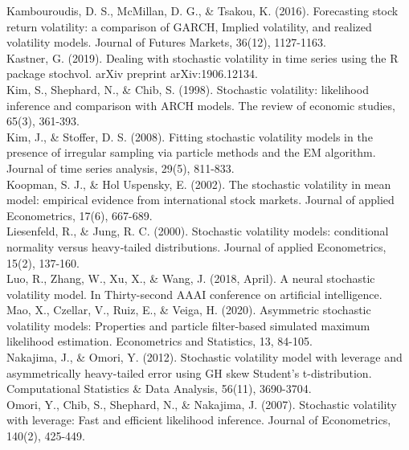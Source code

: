 \documentclass[
]{book}
\theoremstyle{break}
\theoremstyle{nonumberplain}
\begin{document}
Kambouroudis, D. S., McMillan, D. G., \& Tsakou, K. (2016). Forecasting
stock return volatility: a comparison of GARCH, Implied volatility, and
realized volatility models. Journal of Futures Markets, 36(12),
1127-1163.\\

Kastner, G. (2019). Dealing with stochastic volatility in time series
using the R package stochvol. arXiv preprint arXiv:1906.12134.\\

Kim, S., Shephard, N., \& Chib, S. (1998). Stochastic volatility:
likelihood inference and comparison with ARCH models. The review of
economic studies, 65(3), 361-393.\\

Kim, J., \& Stoffer, D. S. (2008). Fitting stochastic volatility models
in the presence of irregular sampling via particle methods and the EM
algorithm. Journal of time series analysis, 29(5), 811-833.\\

Koopman, S. J., \& Hol Uspensky, E. (2002). The stochastic volatility in
mean model: empirical evidence from international stock markets. Journal
of applied Econometrics, 17(6), 667-689.\\

Liesenfeld, R., \& Jung, R. C. (2000). Stochastic volatility models:
conditional normality versus heavy‐tailed distributions. Journal of
applied Econometrics, 15(2), 137-160.\\

Luo, R., Zhang, W., Xu, X., \& Wang, J. (2018, April). A neural
stochastic volatility model. In Thirty-second AAAI conference on
artificial intelligence.\\

Mao, X., Czellar, V., Ruiz, E., \& Veiga, H. (2020). Asymmetric
stochastic volatility models: Properties and particle filter-based
simulated maximum likelihood estimation. Econometrics and Statistics,
13, 84-105.\\

Nakajima, J., \& Omori, Y. (2012). Stochastic volatility model with
leverage and asymmetrically heavy-tailed error using GH skew Student's
t-distribution. Computational Statistics \& Data Analysis, 56(11),
3690-3704.\\

Omori, Y., Chib, S., Shephard, N., \& Nakajima, J. (2007). Stochastic
volatility with leverage: Fast and efficient likelihood inference.
Journal of Econometrics, 140(2), 425-449.\\
\end{document}
